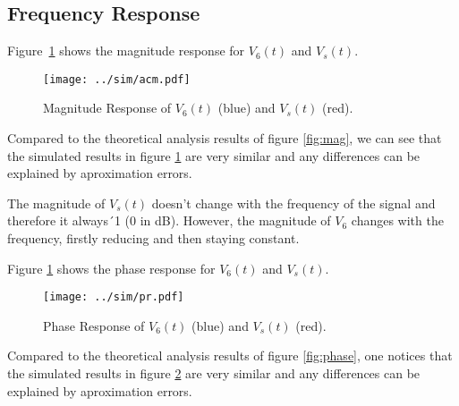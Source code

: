 \subsection{Frequency Response}

Figure~\ref{fig:acm} shows the magnitude response for $V_6(t)$ and $V_s(t)$. 

\begin{figure}[h] \centering
\texttt{[image: ../sim/acm.pdf]}
\caption{Magnitude Response of $V_6(t)$ (blue) and $V_s(t)$ (red).}
\label{fig:acm}
\end{figure}

Compared to the theoretical analysis results of figure \ref{fig:mag}, we can see that the simulated results in figure \ref{fig:acm} are very similar and any differences can be explained by aproximation errors.

The magnitude of $V_s(t)$ doesn't change with the frequency of the signal and therefore it always´1 (0 in dB). However, the magnitude of $V_6$ changes with the frequency, firstly reducing and then staying constant.

Figure \ref{fig:acm} shows the phase response for $V_6(t)$ and $V_s(t)$.

\begin{figure}[h] \centering
\texttt{[image: ../sim/pr.pdf]}
\caption{Phase Response of $V_6(t)$ (blue) and $V_s(t)$ (red).}
\label{fig:pr}
\end{figure}

Compared to the theoretical analysis results of figure \ref{fig:phase}, one notices that the simulated results in figure \ref{fig:pr} are very similar and any differences can be explained by aproximation errors.

